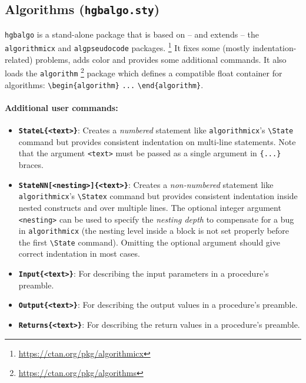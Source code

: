\documentclass[english]{hgbarticle}
\begin{document}
\subsection{Algorithms (\texttt{hgbalgo.sty})}

\texttt{hgbalgo} is a stand-alone package that is based on -- and extends -- the \texttt{algorithmicx} and 
\texttt{algpseudocode} packages.%
\footnote{\url{https://ctan.org/pkg/algorithmicx}}
It fixes some (mostly indentation-related) problems, adds color and provides some additional
commands. It also loads the \texttt{algorithm}%
\footnote{\url{https://ctan.org/pkg/algorithms}}
package which defines a compatible float container for algorithms:
\verb!\begin{algorithm}! \verb!...! \verb!\end{algorithm}!.


\paragraph{Additional user commands:}
\begin{itemize}
\item 
\textbf{\texttt{{\bs}StateL\{<text>\}}}: Creates a \emph{numbered} statement like \texttt{algorithmicx}'s 
\verb!\State! command but provides consistent indentation on multi-line statements.
Note that the argument \texttt{<text>} must be passed as a single argument in \verb!{...}! braces.
\item
\textbf{\texttt{{\bs}StateNN[<nesting>]\{<text>\}}}: 
Creates a \emph{non-numbered} statement like \texttt{algo\-rith\-micx}'s \verb!\Statex! 
command but provides consistent indentation inside nested constructs and over multiple lines.
The optional integer argument \verb!<nesting>! can be used to specify the \emph{nesting depth}
to compensate for a bug in \texttt{algorithmicx} (the nesting level inside a block is not set properly before 
the first \verb!\State! command). Omitting the optional argument should give correct indentation in most
cases.
\item
\textbf{\texttt{{\bs}Input\{<text>\}}}:
For describing the input parameters in a procedure's preamble. %
\item
\textbf{\texttt{{\bs}Output\{<text>\}}}:
For describing the output values in a procedure's preamble. %
\item
\textbf{\texttt{{\bs}Returns\{<text>\}}}:
For describing the return values in a procedure's preamble. %
\end{itemize}
\end{document}
